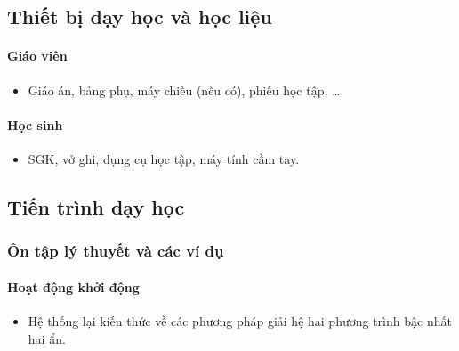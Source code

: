 \subsection{Thiết bị dạy học và học liệu}

\paragraph{Giáo viên}

\begin{itemize}
	\item Giáo án, bảng phụ, máy chiếu (nếu có), phiếu học tập, … 
\end{itemize}

\paragraph{Học sinh}

\begin{itemize}
	\item SGK, vở ghi, dụng cụ học tập, máy tính cầm tay. 
\end{itemize}

\subsection{Tiến trình dạy học}

\danhsachtiet

\subsubsection{Ôn tập lý thuyết và các ví dụ}

\paragraph{Hoạt động khởi động}

\muctieu

\begin{itemize}
	\item Hệ thống lại kiến thức về các phương pháp giải hệ hai phương trình bậc nhất hai ẩn.
\end{itemize}

\noidungsanpham

